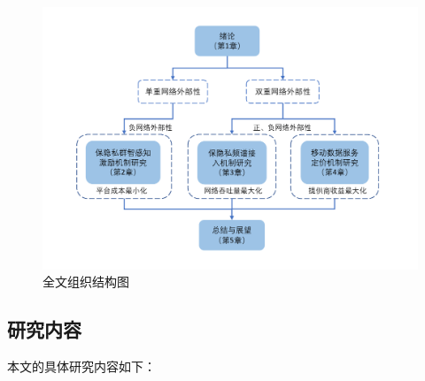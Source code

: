 \begin{figure}[t]
\centering
\includegraphics[width=1.05\textwidth]{pic/jiegou2.pdf}
\caption{全文组织结构图}
\label{fig:the}
\end{figure}

\subsection{研究内容}

本文的具体研究内容如下：


